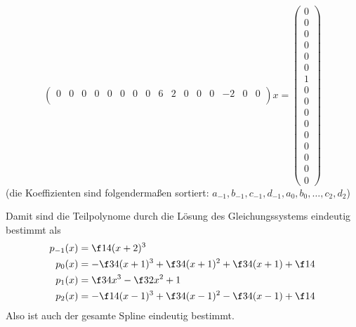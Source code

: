 \documentclass[a4paper]{scrartcl}
\begin{document}
\begin{aufgabe}
\[\begin{pmatrix}
			0 & 0 & 0 & 0 & 0 & 0 & 0 & 0 & 6 & 2 & 0 & 0 & 0 &-2 & 0 & 0 \\
		\end{pmatrix}
		x =
		\begin{pmatrix}
			0 \\ 0 \\ 0 \\ 0 \\ 0 \\ 0 \\ 1 \\ 0 \\ 0 \\ 0 \\ 0 \\ 0 \\ 0 \\ 0 \\ 0 \\ 0
		\end{pmatrix}
	\]
	(die Koeffizienten sind folgendermaßen sortiert: $a_{-1}, b_{-1}, c_{-1}, d_{-1}, a_0, b_0, \dotsc, c_2, d_2$)

	Damit sind die Teilpolynome durch die Lösung des Gleichungssystems eindeutig bestimmt als
	\begin{align*}
		p_{-1}(x) &= \f 14 (x+2)^3 \\
		p_{0}(x) &= -\f 34 (x+1)^3 + \f 34 (x+1)^2 + \f 34 (x+1) + \f 14 \\
		p_{1}(x) &= \f 34 x^3 - \f 32 x^2 + 1 \\
		p_{2}(x) &= -\f 14 (x-1)^3 + \f 34 (x-1)^2 - \f 34 (x-1) + \f 14 \\
	\end{align*}
	Also ist auch der gesamte Spline eindeutig bestimmt.
\end{aufgabe}
\end{document}
